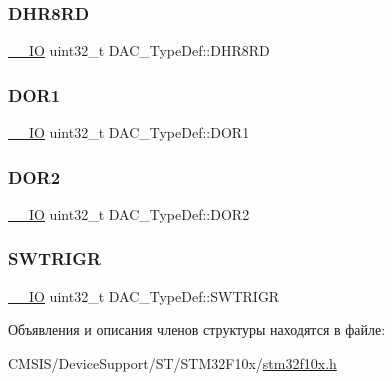 \mbox{\label{struct_d_a_c___type_def_a03f8d95bbf0ce3a53cb79506d5bf995a}} 
\subsubsection{\texorpdfstring{DHR8RD}{DHR8RD}}
{\footnotesize\ttfamily \mbox{\hyperlink{group___c_m_s_i_s___c_m3__core__definitions_gaec43007d9998a0a0e01faede4133d6be}{\+\_\+\+\_\+\+IO}} uint32\+\_\+t D\+A\+C\+\_\+\+Type\+Def\+::\+D\+H\+R8\+RD}

\mbox{\label{struct_d_a_c___type_def_a50b4f0b0d2a376f729c8d7acf47864c3}} 
\subsubsection{\texorpdfstring{DOR1}{DOR1}}
{\footnotesize\ttfamily \mbox{\hyperlink{group___c_m_s_i_s___c_m3__core__definitions_gaec43007d9998a0a0e01faede4133d6be}{\+\_\+\+\_\+\+IO}} uint32\+\_\+t D\+A\+C\+\_\+\+Type\+Def\+::\+D\+O\+R1}

\mbox{\label{struct_d_a_c___type_def_a1bde8391647d6422b39ab5ba4f13848b}} 
\subsubsection{\texorpdfstring{DOR2}{DOR2}}
{\footnotesize\ttfamily \mbox{\hyperlink{group___c_m_s_i_s___c_m3__core__definitions_gaec43007d9998a0a0e01faede4133d6be}{\+\_\+\+\_\+\+IO}} uint32\+\_\+t D\+A\+C\+\_\+\+Type\+Def\+::\+D\+O\+R2}

\mbox{\label{struct_d_a_c___type_def_a4ccb66068a1ebee1179574dda20206b6}} 
\subsubsection{\texorpdfstring{SWTRIGR}{SWTRIGR}}
{\footnotesize\ttfamily \mbox{\hyperlink{group___c_m_s_i_s___c_m3__core__definitions_gaec43007d9998a0a0e01faede4133d6be}{\+\_\+\+\_\+\+IO}} uint32\+\_\+t D\+A\+C\+\_\+\+Type\+Def\+::\+S\+W\+T\+R\+I\+GR}



Объявления и описания членов структуры находятся в файле\+:\begin{DoxyCompactItemize}
\item 
C\+M\+S\+I\+S/\+Device\+Support/\+S\+T/\+S\+T\+M32\+F10x/\mbox{\hyperlink{stm32f10x_8h}{stm32f10x.\+h}}\end{DoxyCompactItemize}
